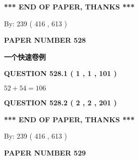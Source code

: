 \documentclass{ctexart}
\begin{document}
   
   
\vspace{1.0in} 
{\textbf{\large{ *** END OF PAPER, THANKS *** }}} 
   
   
\hspace{1.0in} By: 
 239 ( 416 ,  613 )
   
   
   
   
\newpage 
\setcounter{page}{ 
   528001 } 
   
   
   
   
 {\textbf{ \Large{ PAPER NUMBER  528  }}}
   
   
\vspace{0.2in}
   
   
   
   
   
   
 \vspace{0.2in}
{\LARGE {\textbf{ 一个快速卷例}}}
   
   
  
\vspace{0.2in}
  
{\textbf{\Large{QUESTION
528.1 
 ( 1 , 1 , 101 )
}}}
  
  
 
 

$ %
52 +  %
54=   %
106$
 
 
  
\vspace{0.2in}
  
{\textbf{\Large{QUESTION
528.2 
 ( 2 , 2 , 201 )
}}}
  
  
   
   
 \vspace{0.2in}
 
   
   
   
   
\vspace{1.0in} 
{\textbf{\large{ *** END OF PAPER, THANKS *** }}} 
   
   
\hspace{1.0in} By: 
 239 ( 416 ,  613 )
   
   
   
   
\newpage 
\setcounter{page}{ 
   529001 } 
   
   
   
   
 {\textbf{ \Large{ PAPER NUMBER  529  }}}
   
   
\vspace{0.2in}
   
\end{document}
